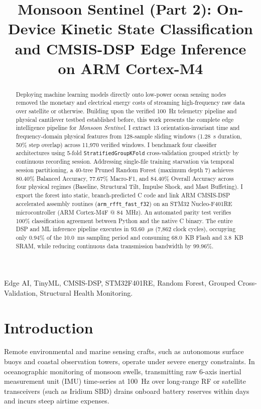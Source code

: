 \documentclass[twocolumn]{article}
\title{Monsoon Sentinel (Part 2): On-Device Kinetic State Classification and CMSIS-DSP Edge Inference on ARM Cortex-M4}
\begin{document}
\ninept
\maketitle

\begin{abstract}
Deploying machine learning models directly onto low-power ocean sensing nodes removed the monetary and electrical energy costs of streaming high-frequency raw data over satellite or otherwise. Building upon the verified 100~Hz telemetry pipeline and physical cantilever testbed established before, this work presents the complete edge intelligence pipeline for \textit{Monsoon Sentinel}. I extract 13 orientation-invariant time and frequency-domain physical features from 128-sample sliding windows (1.28~s duration, 50\% step overlap) across 11,970 verified windows. I benchmark four classifier architectures using 5-fold \texttt{StratifiedGroupKFold} cross-validation grouped strictly by continuous recording session. Addressing single-file training starvation via temporal session partitioning, a 40-tree Pruned Random Forest (maximum depth 7) achieves 80.40\% Balanced Accuracy, 77.67\% Macro-F1, and 84.40\% Overall Accuracy across four physical regimes (Baseline, Structural Tilt, Impulse Shock, and Mast Buffeting). I export the forest into static, branch-predicted C code and link ARM CMSIS-DSP accelerated assembly routines (\texttt{arm\_rfft\_fast\_f32}) on an STM32 Nucleo-F401RE microcontroller (ARM Cortex-M4F @ 84~MHz). An automated parity test verifies 100\% classification agreement between Python and the native C binary. The entire DSP and ML inference pipeline executes in 93.60~$\mu$s (7,862 clock cycles), occupying only 0.94\% of the 10.0~ms sampling period and consuming 68.0~KB Flash and 3.8~KB SRAM, while reducing continuous data transmission bandwidth by 99.96\%.
\end{abstract}

\begin{keywords}
Edge AI, TinyML, CMSIS-DSP, STM32F401RE, Random Forest, Grouped Cross-Validation, Structural Health Monitoring.
\end{keywords}

\section{Introduction}
Remote environmental and marine sensing crafts, such as autonomous surface buoys and coastal observation towers, operate under severe energy constraints. In oceanographic monitoring of monsoon swells, transmitting raw 6-axis inertial measurement unit (IMU) time-series at 100~Hz over long-range RF or satellite transceivers (such as Iridium SBD) drains onboard battery reserves within days and incurs steep airtime expenses. 
\end{document}
